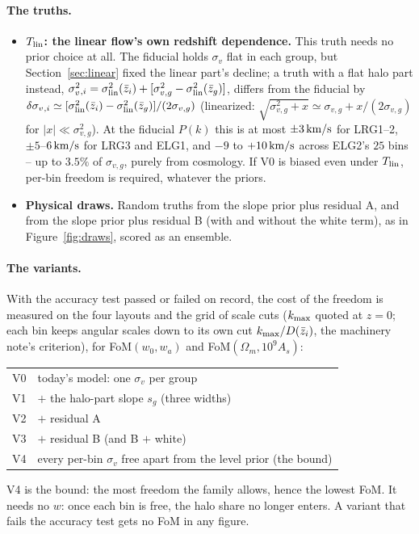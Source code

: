 \documentclass[11pt]{article}
\newcommand{\sv}{\sigma_v}
\newcommand{\svg}{\sigma_{v,g}}
\newcommand{\slin}{\sigma_{\rm lin}}
\newcommand{\kms}{\,{\rm km/s}}
\newcommand{\kmax}{k_{\rm max}}
\begin{document}
\paragraph{The truths.}
\begin{itemize}
  \item \textbf{$T_{\rm lin}$: the linear flow's own redshift
    dependence.}  This truth needs no prior choice at all.  The
    fiducial holds $\sv$ flat in each group, but
    Section~\ref{sec:linear} fixed the linear part's decline; a truth
    with a flat halo part instead,
    $\sv^2{}_{,i} = \slin^2(\bar{z}_i) + [\svg^2 -
    \slin^2(\bar{z}_g)]$, differs from the fiducial by
    $\delta\sv{}_{,i} \simeq [\slin^2(\bar{z}_i) -
    \slin^2(\bar{z}_g)]/(2\svg)$ (linearized:
    $\sqrt{\svg^2 + x} \simeq \svg + x/(2\svg)$ for $|x| \ll \svg^2$).  At the fiducial $P(k)$ this is at
    most $\pm 3\kms$ for LRG1--2, $\pm 5$--$6\kms$ for LRG3 and
    ELG1, and $-9$ to $+10\kms$ across ELG2's $25$ bins -- up to
    $3.5\%$ of $\svg$, purely from cosmology.  If V0 is biased even
    under $T_{\rm lin}$, per-bin freedom is required, whatever the
    priors.
  \item \textbf{Physical draws.}  Random truths from the slope prior
    plus residual A, and from the slope prior plus residual B (with
    and without the white term), as in Figure~\ref{fig:draws}, scored
    as an ensemble.
\end{itemize}

\paragraph{The variants.}
With the accuracy test passed or failed on record, the cost of the
freedom is measured on the four layouts and the grid of scale cuts
($\kmax$ quoted at $z = 0$; each bin keeps angular scales down to its
own cut $\kmax/D(\bar{z}_i)$, the machinery note's criterion), for
FoM$(w_0, w_a)$ and FoM$(\Omega_m, 10^9 A_s)$:
\begin{center}
  \begin{tabular}{ll}
    \hline
    V0 & today's model: one $\sv$ per group \\
    V1 & $+$ the halo-part slope $s_g$ (three widths) \\
    V2 & $+$ residual A \\
    V3 & $+$ residual B (and B $+$ white) \\
    V4 & every per-bin $\sv$ free apart from the level prior
         (the bound) \\
    \hline
  \end{tabular}
\end{center}
V4 is the bound: the most freedom the family allows, hence the lowest
FoM.  It needs no $w$: once each bin is free, the halo share no longer
enters.  A variant that fails the accuracy test gets no FoM in any
figure.
\end{document}
